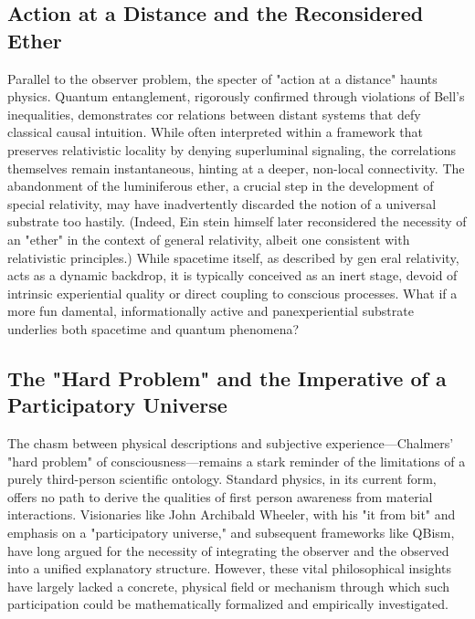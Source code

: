 \documentclass{report}
\begin{document}
    \subsection{Action at a Distance and the Reconsidered Ether}
    \label{subsec:action_distance_ether}
    Parallel to the observer problem, the specter of "action at a distance" haunts physics. Quantum
    entanglement, rigorously confirmed through violations of Bell’s inequalities, demonstrates cor relations between distant systems that defy classical causal intuition. While often interpreted
    within a framework that preserves relativistic locality by denying superluminal signaling, the
    correlations themselves remain instantaneous, hinting at a deeper, non-local connectivity. The
    abandonment of the luminiferous ether, a crucial step in the development of special relativity,
    may have inadvertently discarded the notion of a universal substrate too hastily. (Indeed, Ein stein himself later reconsidered the necessity of an "ether" in the context of general relativity,
    albeit one consistent with relativistic principles.) While spacetime itself, as described by gen eral relativity, acts as a dynamic backdrop, it is typically conceived as an inert stage, devoid
    of intrinsic experiential quality or direct coupling to conscious processes. What if a more fun damental, informationally active and panexperiential substrate underlies both spacetime and
    quantum phenomena?

    \subsection{The "Hard Problem" and the Imperative of a Participatory Universe}
    \label{subsec:hard_problem_participatory}
    The chasm between physical descriptions and subjective experience—Chalmers’ "hard problem"
    of consciousness—remains a stark reminder of the limitations of a purely third-person scientific
    ontology. Standard physics, in its current form, offers no path to derive the qualities of first person awareness from material interactions. Visionaries like John Archibald Wheeler, with
    his "it from bit" and emphasis on a "participatory universe," and subsequent frameworks like
    QBism, have long argued for the necessity of integrating the observer and the observed into a
    unified explanatory structure. However, these vital philosophical insights have largely lacked a
    concrete, physical field or mechanism through which such participation could be mathematically
    formalized and empirically investigated.
\end{document}
